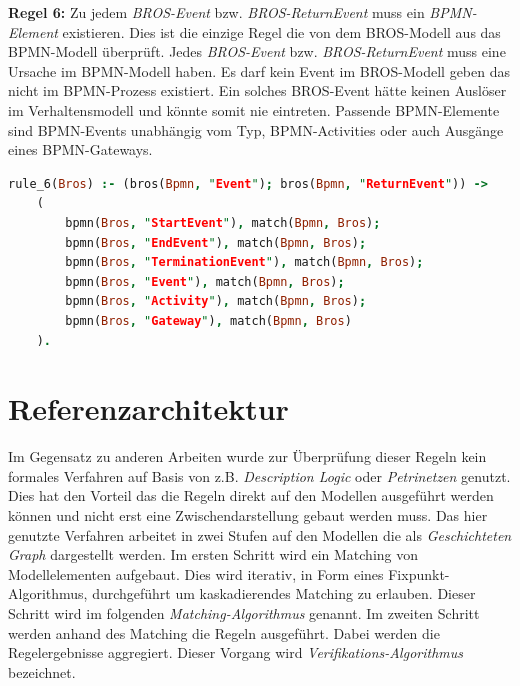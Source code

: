\textbf{Regel 6:} Zu jedem \emph{BROS-Event} bzw. \emph{BROS-ReturnEvent} muss ein \emph{BPMN-Element} existieren.
Dies ist die einzige Regel die von dem BROS-Modell aus das BPMN-Modell überprüft.
Jedes \emph{BROS-Event} bzw. \emph{BROS-ReturnEvent} muss eine Ursache im BPMN-Modell haben.
Es darf kein Event im BROS-Modell geben das nicht im BPMN-Prozess existiert.
Ein solches BROS-Event hätte keinen Auslöser im Verhaltensmodell und könnte somit nie eintreten.
Passende BPMN-Elemente sind BPMN-Events unabhängig vom Typ, BPMN-Activities oder auch Ausgänge eines BPMN-Gateways.

\begin{lstlisting}[language=Prolog, caption=Regel 6]
rule_6(Bros) :- (bros(Bpmn, "Event"); bros(Bpmn, "ReturnEvent")) ->
    (
        bpmn(Bros, "StartEvent"), match(Bpmn, Bros);
        bpmn(Bros, "EndEvent"), match(Bpmn, Bros);
        bpmn(Bros, "TerminationEvent"), match(Bpmn, Bros);
        bpmn(Bros, "Event"), match(Bpmn, Bros);
        bpmn(Bros, "Activity"), match(Bpmn, Bros);
        bpmn(Bros, "Gateway"), match(Bpmn, Bros)
    ).
\end{lstlisting}

\section{Referenzarchitektur}

Im Gegensatz zu anderen Arbeiten wurde zur Überprüfung dieser Regeln kein formales Verfahren auf Basis von z.B. \emph{Description Logic} oder \emph{Petrinetzen} genutzt.
Dies hat den Vorteil das die Regeln direkt auf den Modellen ausgeführt werden können und nicht erst eine Zwischendarstellung gebaut werden muss.
Das hier genutzte Verfahren arbeitet in zwei Stufen auf den Modellen die als \emph{Geschichteten Graph} dargestellt werden.
Im ersten Schritt wird ein Matching von Modellelementen aufgebaut. Dies wird iterativ, in Form eines Fixpunkt-Algorithmus, durchgeführt um kaskadierendes Matching zu erlauben.
Dieser Schritt wird im folgenden \emph{Matching-Algorithmus} genannt.
Im zweiten Schritt werden anhand des Matching die Regeln ausgeführt.
Dabei werden die Regelergebnisse aggregiert.
Dieser Vorgang wird \emph{Verifikations-Algorithmus} bezeichnet.

